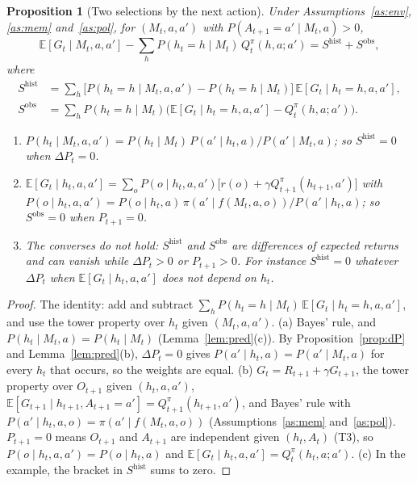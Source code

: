 \documentclass{article}
\newtheorem{proposition}{Proposition}[section]
\theoremstyle{definition}
\theoremstyle{remark}
\newcommand{\E}{\mathbb{E}}
\newcommand{\dP}{\Delta P}
\begin{document}
\begin{proposition}[Two selections by the next action]\label{prop:selection}
Under Assumptions~\ref{as:env}, \ref{as:mem} and~\ref{as:pol}, for $(M_t,a,a')$ with $P(A_{t+1}=a'\mid M_t,a)>0$,
\[
\E[G_t\mid M_t,a,a']-\sum_hP(h_t=h\mid M_t)\,Q^\pi_t(h,a;a')=S^{\mathrm{hist}}+S^{\mathrm{obs}},
\]
where
\begin{align*}
S^{\mathrm{hist}}&=\sum_h\big[P(h_t=h\mid M_t,a,a')-P(h_t=h\mid M_t)\big]\,\E[G_t\mid h_t=h,a,a'],\\
S^{\mathrm{obs}}&=\sum_hP(h_t=h\mid M_t)\big(\E[G_t\mid h_t=h,a,a']-Q^\pi_t(h,a;a')\big).
\end{align*}
\begin{enumerate}
\item[(a)] $P(h_t\mid M_t,a,a')=P(h_t\mid M_t)\,P(a'\mid h_t,a)/P(a'\mid M_t,a)$; so $S^{\mathrm{hist}}=0$ when $\dP_t=0$.
\item[(b)] $\E[G_t\mid h_t,a,a']=\sum_oP(o\mid h_t,a,a')\big[r(o)+\gamma Q^\pi_{t+1}(h_{t+1},a')\big]$ with $P(o\mid h_t,a,a')=P(o\mid h_t,a)\,\pi(a'\mid f(M_t,a,o))/P(a'\mid h_t,a)$; so $S^{\mathrm{obs}}=0$ when $P_{t+1}=0$.
\item[(c)] The converses do not hold: $S^{\mathrm{hist}}$ and $S^{\mathrm{obs}}$ are differences of expected returns and can vanish while $\dP_t>0$ or $P_{t+1}>0$. For instance $S^{\mathrm{hist}}=0$ whatever $\dP_t$ when $\E[G_t\mid h_t,a,a']$ does not depend on $h_t$.
\end{enumerate}
\end{proposition}

\begin{proof}
The identity: add and subtract $\sum_hP(h_t=h\mid M_t)\,\E[G_t\mid h_t=h,a,a']$, and use the tower property over $h_t$ given $(M_t,a,a')$. (a) Bayes' rule, and $P(h_t\mid M_t,a)=P(h_t\mid M_t)$ (Lemma~\ref{lem:pred}(c)). By Proposition~\ref{prop:dP} and Lemma~\ref{lem:pred}(b), $\dP_t=0$ gives $P(a'\mid h_t,a)=P(a'\mid M_t,a)$ for every $h_t$ that occurs, so the weights are equal. (b) $G_t=R_{t+1}+\gamma G_{t+1}$, the tower property over $O_{t+1}$ given $(h_t,a,a')$, $\E[G_{t+1}\mid h_{t+1},A_{t+1}=a']=Q^\pi_{t+1}(h_{t+1},a')$, and Bayes' rule with $P(a'\mid h_t,a,o)=\pi(a'\mid f(M_t,a,o))$ (Assumptions~\ref{as:mem} and~\ref{as:pol}). $P_{t+1}=0$ means $O_{t+1}$ and $A_{t+1}$ are independent given $(h_t,A_t)$ (T3), so $P(o\mid h_t,a,a')=P(o\mid h_t,a)$ and $\E[G_t\mid h_t,a,a']=Q^\pi_t(h_t,a;a')$. (c) In the example, the bracket in $S^{\mathrm{hist}}$ sums to zero.
\end{proof}
\end{document}
